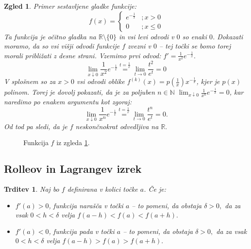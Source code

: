 \documentclass[10pt, a4paper]{article}
\newtheorem{trditev}[izr]{Trditev}
\newtheorem{zgled}{Zgled}[section]
\newcommand{\N}{\mathbb {N}}
\newcommand{\R}{\mathbb {R}}
\newcommand{\limf}[3]{\lim_{#1 \to #2} {#3}}
\newcommand{\rlimf}[3]{\lim_{#1 \downarrow #2} {#3}}
\begin{document}
\begin{zgled}
    \label{zgl:3}
    Primer sestavljene gladke funkcije:
    $$f(x) = \begin{cases}
        e^{-\frac{1}{x}} &; x > 0\\
        0 &; x \leq 0
    \end{cases}$$
    Ta funkcija je očitno gladka na $\R \setminus \{0\}$ in vsi levi odvodi v $0$ so enaki $0$.
    Dokazati moramo, da so vsi višji odvodi funkcije $f$ zvezni v $0$ -- tej točki se bomo torej morali približati z desne strani.
    Vzemimo prvi odvod: $f' =\frac{1}{x^2} e^{-\frac{1}{x}}.$
    $$\rlimf{x}{0}{\frac{1}{x^2} e^{-\frac{1}{x}}} \stackrel{t = \frac{1}{x}}{=} \limf{t}{0}{\frac{t^2}{e^t}} = 0$$
    V splošnem so za $x > 0$ vsi odvodi oblike $f^{(k)} (x) = p (\frac{1}{x}) x^{-\frac{1}{x}}$, kjer je $p(x)$ polinom.
    Torej je dovolj pokazati, da je za poljuben $n \in \N$ $\rlimf{x}{0}{\frac{1}{x^n} e^{-\frac{1}{x}}} = 0$, kar naredimo po enakem argumentu kot zgoraj:
    $$\rlimf{x}{0}{\frac{1}{x^n} e^{-\frac{1}{x}}} \stackrel{t = \frac{1}{x}}{=} \limf{t}{0}{\frac{t^n}{e^t}} = 0.$$
    Od tod pa sledi, da je $f$ neskončnokrat odvedljiva na $\R.$
\end{zgled}

\begin{figure}[hbt!]
    \centering
    \caption{Funkcija $f$ iz zgleda \ref{zgl:3}.}
\end{figure}

\subsection{Rolleov in Lagrangev izrek}

\begin{trditev}
    Naj bo $f$ definirana v kolici točke $a$. Če je:
    \begin{itemize}
        \item $f'(a) > 0$, funkcija narašča v točki $a$ -- 
        to pomeni, da obstaja $\delta > 0,$ da za vsak $0 < h < \delta$ velja $f(a-h) < f(a) < f(a+h).$
        \item $f'(a) < 0$, funkcija pada v točki $a$ -- 
        to pomeni, da obstaja $\delta > 0,$ da za vsak $0 < h < \delta$ velja $f(a-h) > f(a) > f(a+h).$
    \end{itemize}
\end{trditev}
\end{document}

